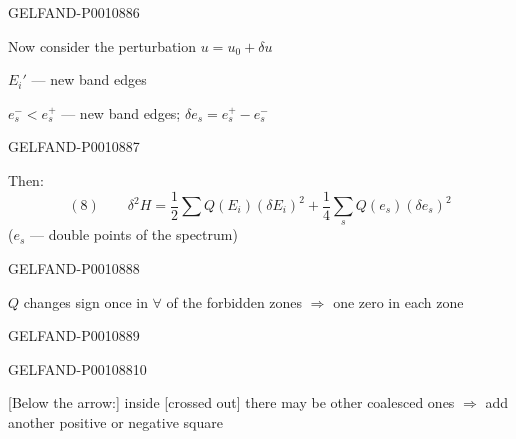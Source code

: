 \begin{GelfandAdjacentEvidence}{GELFAND-P001088}{6}


Now consider the perturbation $u=u_0+\delta u$

$E_i'$ — new band edges

$e_s^-<e_s^+$ — new band edges; $\delta e_s=e_s^+-e_s^-$
\end{GelfandAdjacentEvidence}
\begin{GelfandAdjacentEvidence}{GELFAND-P001088}{7}


Then:
\[
(8)\qquad
\delta^2H=\frac12\sum Q(E_i)(\delta E_i)^2
+\frac14\sum_s Q(e_s)(\delta e_s)^2
\]
($e_s$ — double points of the spectrum)
\end{GelfandAdjacentEvidence}
\begin{GelfandAdjacentEvidence}{GELFAND-P001088}{8}


$Q$ changes sign once in $\forall$ of the forbidden zones $\Rightarrow$ one zero in each zone
\end{GelfandAdjacentEvidence}
\begin{GelfandAdjacentEvidence}{GELFAND-P001088}{9}


\end{GelfandAdjacentEvidence}
\begin{GelfandAdjacentEvidence}{GELFAND-P001088}{10}

[Below the arrow:] inside [crossed out] there may be other coalesced ones $\Rightarrow$ add another positive or negative square
\end{GelfandAdjacentEvidence}
